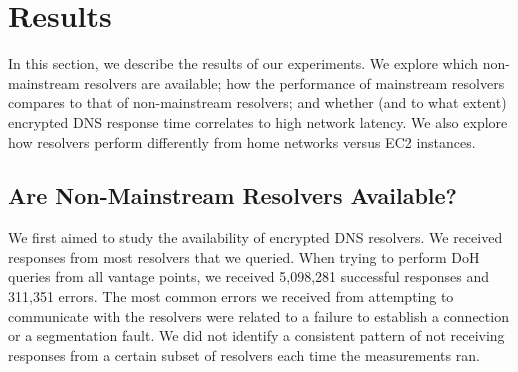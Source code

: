\section{Results}\label{sec:results} 

In this section, we describe the results of our experiments.  We explore which
non-mainstream resolvers are available; how
the performance of mainstream resolvers compares to that of non-mainstream
resolvers; and whether (and to what extent) encrypted DNS response time
correlates to high network latency. We also explore how resolvers perform 
differently from home networks versus EC2 instances. 

\subsection{Are Non-Mainstream Resolvers Available?}

We first aimed to study the availability of encrypted DNS
resolvers. 
We received responses from most resolvers that we queried. When trying to perform DoH queries from all vantage points,
we received 5,098,281 successful responses and 311,351 errors. 
The most common errors we received from attempting to communicate with
the resolvers were related to a failure to establish a connection or a segmentation fault.
We did not identify a consistent pattern of not receiving responses from a certain
subset of resolvers each time the measurements ran. 

